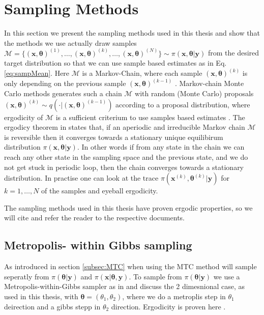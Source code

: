 \section{Sampling Methods}
\label{sec:sampling}
In this section we present the sampling methods used in this thesis and show that the methods we use actually draw samples $ \mathcal{M} = \{ (\bm{x}, \bm{\theta} )^{(1)}, \dots, (\bm{x}, \bm{\theta} )^{(k)} , \dots,  (\bm{x}, \bm{\theta})^{(N)} \} \sim \pi(\bm{x},\bm{\theta}| \bm{y}) $ from the desired target distribution so that we can use sample based estimates as in Eq. \ref{eq:sampMean}.
Here $ \mathcal{M}$ is a Markov-Chain, where each sample $ (\bm{x}, \bm{\theta})^{(k)}$ is only depending on the previous sample  $ (\bm{x}, \bm{\theta})^{(k-1)}$ \cite{}.
Markov-chain Monte Carlo methods generates such a chain $\mathcal{M}$ with random (Monte Carlo) proposals $(\bm{x}, \bm{\theta})^{(k)} \sim q( \cdot |(\bm{x}, \bm{\theta})^{(k-1)})$ according to a proposal distribution, where ergodicity of $\mathcal{M}$ is a sufficient criterium to use samples based estimates \cite{tan2016LecNot, roberts2004general}.
The ergodicy theorem in \cite{tan2016LecNot} states that, if an aperiodic and irreducible Markov chain $\mathcal{M}$ is reversible then it converges towards a stationary unique equilibirum distribution $\pi(\bm{x},\bm{\theta}| \bm{y}) $.
In other words if from any state in the chain we can reach any other state in the sampling space and the previous state, and we do not get stuck in periodic loop, then the chain converges towards a stationary distribution.
In practise one can look at the trace $\pi(\bm{x}^{(k)},\bm{\theta}^{(k)}| \bm{y}) $ for $k = 1, \dots, N$ of the samples and eyeball ergodicity.

The sampling methods used in this thesis have proven ergodic properties, so we will cite and refer the reader to the respective documents.

\subsection{Metropolis- within Gibbs sampling}

As introduced in section \ref{subsec:MTC} when using the MTC method will sample seperatly from $\pi(\bm{\theta}| \bm{y})$ and $\pi(\bm{x}|\bm{\theta}, \bm{y}) $.
To sample from $\pi(\bm{\theta}| \bm{y})$ we use a Metropolis-within-Gibbs sampler as in \cite{fox2016fast} and discuss the 2 dimesnional case, as used in this thesis, with $\bm{\theta}  =( \theta_1 , \theta_2) $, where we do a metroplis step in $\theta_1$ deirection and a gibbs stepp in $\theta_2$ direction.
Ergodicity is proven here \cite{roberts2006harris}.

